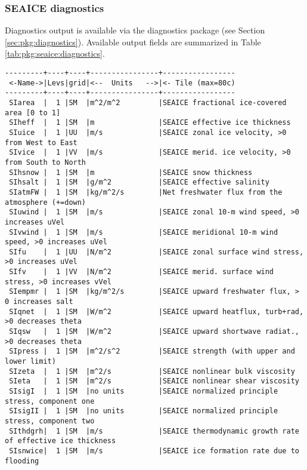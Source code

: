 
\subsubsection{SEAICE diagnostics
\label{sec:pkg:seaice:diagnostics}}

Diagnostics output is available via the diagnostics package
(see Section \ref{sec:pkg:diagnostics}).
Available output fields are summarized in 
Table \ref{tab:pkg:seaice:diagnostics}.

\begin{table}[h!]
\centering
\label{tab:pkg:seaice:diagnostics}
{\footnotesize
\begin{verbatim}
---------+----+----+----------------+-----------------
 <-Name->|Levs|grid|<--  Units   -->|<- Tile (max=80c)
---------+----+----+----------------+-----------------
 SIarea  |  1 |SM  |m^2/m^2         |SEAICE fractional ice-covered area [0 to 1]
 SIheff  |  1 |SM  |m               |SEAICE effective ice thickness
 SIuice  |  1 |UU  |m/s             |SEAICE zonal ice velocity, >0 from West to East
 SIvice  |  1 |VV  |m/s             |SEAICE merid. ice velocity, >0 from South to North
 SIhsnow |  1 |SM  |m               |SEAICE snow thickness
 SIhsalt |  1 |SM  |g/m^2           |SEAICE effective salinity
 SIatmFW |  1 |SM  |kg/m^2/s        |Net freshwater flux from the atmosphere (+=down)
 SIuwind |  1 |SM  |m/s             |SEAICE zonal 10-m wind speed, >0 increases uVel
 SIvwind |  1 |SM  |m/s             |SEAICE meridional 10-m wind speed, >0 increases uVel
 SIfu    |  1 |UU  |N/m^2           |SEAICE zonal surface wind stress, >0 increases uVel
 SIfv    |  1 |VV  |N/m^2           |SEAICE merid. surface wind stress, >0 increases vVel
 SIempmr |  1 |SM  |kg/m^2/s        |SEAICE upward freshwater flux, > 0 increases salt
 SIqnet  |  1 |SM  |W/m^2           |SEAICE upward heatflux, turb+rad, >0 decreases theta
 SIqsw   |  1 |SM  |W/m^2           |SEAICE upward shortwave radiat., >0 decreases theta
 SIpress |  1 |SM  |m^2/s^2         |SEAICE strength (with upper and lower limit)
 SIzeta  |  1 |SM  |m^2/s           |SEAICE nonlinear bulk viscosity
 SIeta   |  1 |SM  |m^2/s           |SEAICE nonlinear shear viscosity
 SIsigI  |  1 |SM  |no units        |SEAICE normalized principle stress, component one
 SIsigII |  1 |SM  |no units        |SEAICE normalized principle stress, component two
 SIthdgrh|  1 |SM  |m/s             |SEAICE thermodynamic growth rate of effective ice thickness
 SIsnwice|  1 |SM  |m/s             |SEAICE ice formation rate due to flooding

\end{verbatim}}
\end{table}
